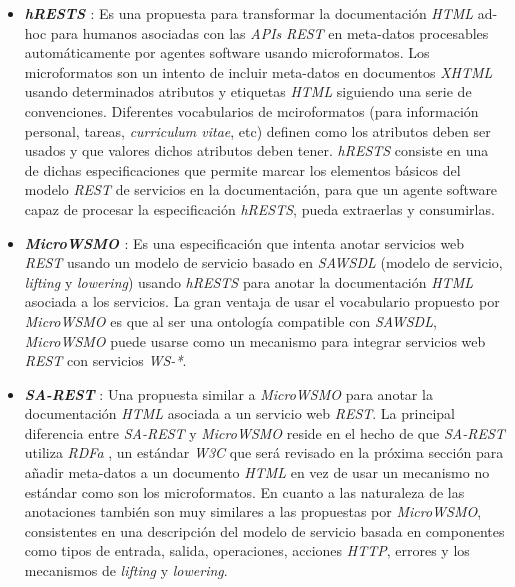 \begin{itemize}

\item \textbf{\textit{hRESTS} \cite{hrests}}: Es una propuesta para transformar la documentaci\'on \textit{HTML} ad-hoc para humanos asociadas con las \textit{APIs} \textit{REST} en meta-datos procesables autom\'aticamente por agentes software usando microformatos. Los microformatos \cite{microformats} son un intento de incluir meta-datos en documentos \textit{XHTML} usando determinados atributos y etiquetas \textit{HTML} siguiendo una serie de convenciones. Diferentes vocabularios de mciroformatos (para informaci\'on personal, tareas, \textit{curriculum vitae}, etc) definen como los atributos deben ser usados y que valores dichos atributos deben tener. \textit{hRESTS} consiste en una de dichas especificaciones que permite marcar los elementos b\'asicos del modelo \textit{REST} de servicios en la documentaci\'on, para que un agente software capaz de procesar la especificaci\'on \textit{hRESTS}, pueda extraerlas y consumirlas.

\item \textbf{\textit{MicroWSMO} \cite{microwsmo}}: Es una especificaci\'on que intenta anotar servicios web \textit{REST} usando un modelo de servicio basado en \textit{SAWSDL} \cite{sawsdl} (modelo de servicio, \textit{lifting} y \textit{lowering}) usando \textit{hRESTS} para anotar la documentaci\'on \textit{HTML} asociada a los servicios. La gran ventaja de usar el vocabulario propuesto por \textit{MicroWSMO} es que al ser una ontolog\'ia compatible con \textit{SAWSDL}, \textit{MicroWSMO} puede usarse como un mecanismo para integrar servicios web \textit{REST} con servicios \textit{WS-*}.

\item \textbf{\textit{SA-REST}} \cite{sarest}: Una propuesta similar a \textit{MicroWSMO} para anotar la documentaci\'on \textit{HTML} asociada a un servicio web \textit{REST}. La principal diferencia entre \textit{SA-REST} y \textit{MicroWSMO} reside en el hecho de que \textit{SA-REST} utiliza \textit{RDFa} \cite{rdfa}, un est\'andar \textit{W3C} que ser\'a revisado en la pr\'oxima secci\'on para a\~nadir meta-datos a un documento \textit{HTML} en vez de usar un mecanismo no est\'andar como son los microformatos. En cuanto a las naturaleza de las anotaciones tambi\'en son muy similares a las propuestas por \textit{MicroWSMO}, consistentes en una descripci\'on del modelo de servicio basada en componentes como tipos de entrada, salida, operaciones, acciones \textit{HTTP}, errores y los mecanismos de \textit{lifting} y \textit{lowering}.

\end{itemize}

